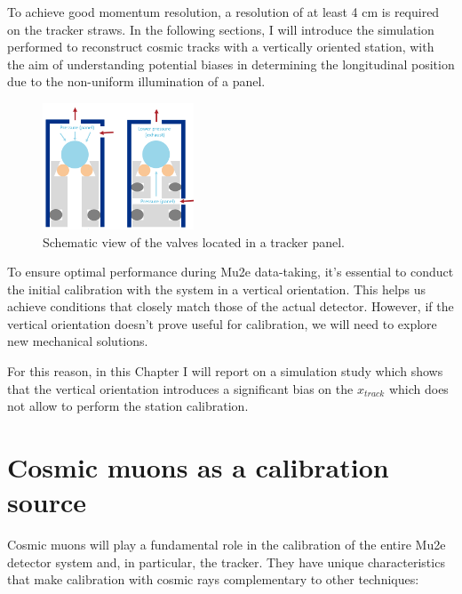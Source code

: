 To achieve good momentum resolution, a resolution of at least 4 cm 
is required on the tracker straws. In the following sections, I will 
introduce the simulation performed to reconstruct cosmic tracks 
with a vertically oriented station, with the aim of understanding 
potential biases in determining the longitudinal position due to 
the non-uniform illumination of a panel.

\begin{figure}[!h]
    \centering
    \includegraphics[width =0.4\textwidth]{figures/png/gassystem.png}
    \caption[Schematic view of the valves located in a tracker panel.]{Schematic view of the valves located in a tracker panel.}
    \label{fig:gassystem}
\end{figure}
To ensure optimal performance during Mu2e data-taking, it's essential to 
conduct the initial calibration with the system in a vertical orientation. 
This helps us achieve conditions that closely 
match those of the actual detector. However, if the vertical 
orientation doesn't prove useful for calibration, 
we will need to explore new mechanical solutions.

For this reason, in this Chapter I will report on a simulation study 
which shows that the vertical orientation introduces a significant bias on 
the $x_{track}$ which does not allow to perform the station 
calibration. 



\section{Cosmic muons as a calibration source}
Cosmic muons will play a fundamental role in the 
calibration of the entire Mu2e detector system and, 
in particular, the tracker. They have unique 
characteristics that make calibration with cosmic rays 
complementary to other techniques:

 

